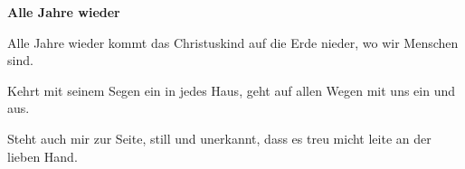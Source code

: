 \documentclass[10pt]{article}
\begin{document}
{\Large
\begin{guitar}
    \textbf{Alle Jahre wieder}


    Alle Jahre wieder
    kommt das Christuskind
    auf die Erde nieder,
    wo wir Menschen sind.


    Kehrt mit seinem Segen
    ein in jedes Haus,
    geht auf allen Wegen
    mit uns ein und aus.


    Steht auch mir zur Seite,
    still und unerkannt,
    dass es treu micht leite
    an der lieben Hand.
\end{guitar}
}
\end{document}

